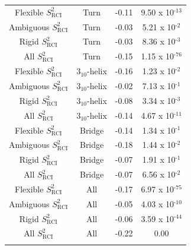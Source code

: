 \begin{table}[H]
\begin{tabular}{cccc}
\arrayrulecolor[gray]{0.8}\hline
Flexible $S_{\text{RCI}}^{2}$  & Turn                & -0.11                       & 9.50 x 10$^{\text{-13}}$      \\
Ambiguous $S_{\text{RCI}}^{2}$ & Turn                & -0.03                       & 5.21 x 10$^{\text{-2}}$      \\
Rigid $S_{\text{RCI}}^{2}$     & Turn                & -0.03                       & 8.36 x 10$^{\text{-3}}$      \\
All $S_{\text{RCI}}^{2}$       & Turn                & -0.15                       & 1.15 x 10$^{\text{-76}}$     \\
\arrayrulecolor[gray]{0.8}\hline
Flexible $S_{\text{RCI}}^{2}$  & 3$_{10}$-helix      & -0.16                       & 1.23 x 10$^{\text{-2}}$      \\
Ambiguous $S_{\text{RCI}}^{2}$ & 3$_{10}$-helix      & -0.02                       & 7.13 x 10$^{\text{-1}}$      \\
Rigid $S_{\text{RCI}}^{2}$     & 3$_{10}$-helix      & -0.08                       & 3.34 x 10$^{\text{-3}}$      \\
All $S_{\text{RCI}}^{2}$       & 3$_{10}$-helix      & -0.14                       & 4.67 x 10$^{\text{-11}}$     \\
\arrayrulecolor[gray]{0.8}\hline
Flexible $S_{\text{RCI}}^{2}$  & Bridge              & -0.14                       & 1.34 x 10$^{\text{-1}}$      \\
Ambiguous $S_{\text{RCI}}^{2}$ & Bridge              & -0.18                       & 1.44 x 10$^{\text{-2}}$      \\
Rigid $S_{\text{RCI}}^{2}$     & Bridge              & -0.07                       & 1.91 x 10$^{\text{-1}}$      \\
All $S_{\text{RCI}}^{2}$       & Bridge              & -0.07                       & 6.56 x 10$^{\text{-2}}$      \\
\arrayrulecolor[gray]{0.8}\hline
Flexible $S_{\text{RCI}}^{\text{2}}$  & All                 & -0.17                       & 6.97 x 10$^{\text{-75}}$     \\
Ambiguous $S_{\text{RCI}}^{\text{2}}$ & All                 & -0.05                       & 4.03 x 10$^{\text{-10}}$     \\
Rigid $S_{\text{RCI}}^{\text{2}}$     & All                 & -0.06                       & 3.59 x 10$^{\text{-44}}$     \\
All $S_{\text{RCI}}^{\text{2}}$       & All                 & -0.22                       & 0.00                         \\ \arrayrulecolor{black} \bottomrule
\end{tabular}
\end{table}

